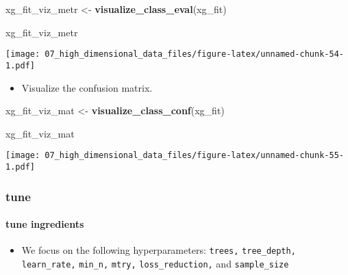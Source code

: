 \documentclass[
]{book}
\newenvironment{Shaded}{\begin{snugshade}}{\end{snugshade}}
\newcommand{\KeywordTok}[1]{\textcolor[rgb]{0.13,0.29,0.53}{\textbf{#1}}}
\newcommand{\NormalTok}[1]{#1}
\newcommand{\StringTok}[1]{\textcolor[rgb]{0.31,0.60,0.02}{#1}}
\providecommand{\tightlist}{%
  \setlength{\itemsep}{0pt}\setlength{\parskip}{0pt}}
\begin{document}
\begin{Shaded}
\begin{Highlighting}[]
\NormalTok{xg\_fit\_viz\_metr \textless{}{-}}
\StringTok{  }\KeywordTok{visualize\_class\_eval}\NormalTok{(xg\_fit)}

\NormalTok{xg\_fit\_viz\_metr}
\end{Highlighting}
\end{Shaded}

\texttt{[image: 07\_high\_dimensional\_data\_files/figure-latex/unnamed-chunk-54-1.pdf]}

\begin{itemize}
\tightlist
\item
  Visualize the confusion matrix.
\end{itemize}

\begin{Shaded}
\begin{Highlighting}[]
\NormalTok{xg\_fit\_viz\_mat \textless{}{-}}
\StringTok{  }\KeywordTok{visualize\_class\_conf}\NormalTok{(xg\_fit)}

\NormalTok{xg\_fit\_viz\_mat}
\end{Highlighting}
\end{Shaded}

\texttt{[image: 07\_high\_dimensional\_data\_files/figure-latex/unnamed-chunk-55-1.pdf]}

\hypertarget{tune-3}{%
\subsubsection{tune}\label{tune-3}}

\hypertarget{tune-ingredients-3}{%
\paragraph{tune ingredients}\label{tune-ingredients-3}}

\begin{itemize}
\tightlist
\item
  We focus on the following hyperparameters: \texttt{trees,} \texttt{tree\_depth,} \texttt{learn\_rate,} \texttt{min\_n,} \texttt{mtry,} \texttt{loss\_reduction,} and \texttt{sample\_size}
\end{itemize}
\end{document}
